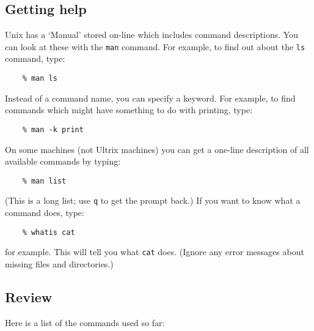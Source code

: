 \subsection{Getting help}

Unix has a `Manual' stored on-line which includes command descriptions.
You can look at these with the {\tt man} command.
For example, to find out about the {\tt ls} command, type:
\begin{verbatim}
    % man ls
\end{verbatim}
Instead of a command name, you can specify a keyword.
For example, to find commands which might have something to do with printing,
type:
\begin{verbatim}
    % man -k print
\end{verbatim}
On some machines (not Ultrix machines) you can get a one-line description of
all available commands by typing:
\begin{verbatim}
    % man list
\end{verbatim}
(This is a long list; use {\tt q} to get the prompt back.)
If you want to know what a command does, type:
\begin{verbatim}
    % whatis cat
\end{verbatim}
for example.
This will tell you what {\tt cat} does.
(Ignore any error messages about missing files and directories.)

\subsection{Review}

Here is a list of the commands used so far:

